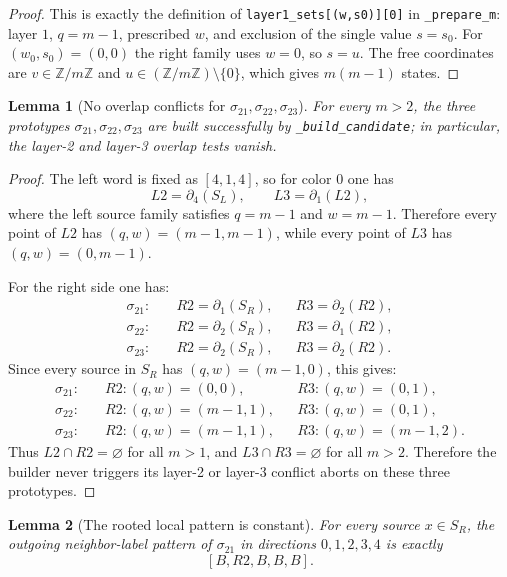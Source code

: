 \documentclass[11pt]{article}
\newtheorem{lemma}{Lemma}
\theoremstyle{remark}
\newcommand{\stepd}[1]{\partial_{#1}}
\begin{document}
\begin{proof}
This is exactly the definition of \texttt{layer1\_sets[(w,s0)][0]} in \texttt{\_prepare\_m}: layer \(1\),
\(q=m-1\), prescribed \(w\), and exclusion of the single value \(s=s_0\).  For \((w_0,s_0)=(0,0)\) the right family
uses \(w=0\), so \(s=u\).  The free coordinates are \(v\in\mathbb Z/m\mathbb Z\) and \(u\in(\mathbb Z/m\mathbb Z)\setminus\{0\}\),
which gives \(m(m-1)\) states.
\end{proof}

\begin{lemma}[No overlap conflicts for \(\sigma_{21},\sigma_{22},\sigma_{23}\)]
For every \(m>2\), the three prototypes \(\sigma_{21},\sigma_{22},\sigma_{23}\) are built successfully by
\texttt{\_build\_candidate}; in particular, the layer-2 and layer-3 overlap tests vanish.
\end{lemma}

\begin{proof}
The left word is fixed as \([4,1,4]\), so for color \(0\) one has
\[
L2=\stepd{4}(S_L),\qquad L3=\stepd{1}(L2),
\]
where the left source family satisfies \(q=m-1\) and \(w=m-1\).  Therefore every point of \(L2\) has
\((q,w)=(m-1,m-1)\), while every point of \(L3\) has \((q,w)=(0,m-1)\).

For the right side one has:
\begin{align*}
\sigma_{21}:&\quad R2=\stepd{1}(S_R), && R3=\stepd{2}(R2),\\
\sigma_{22}:&\quad R2=\stepd{2}(S_R), && R3=\stepd{1}(R2),\\
\sigma_{23}:&\quad R2=\stepd{2}(S_R), && R3=\stepd{2}(R2).
\end{align*}
Since every source in \(S_R\) has \((q,w)=(m-1,0)\), this gives:
\begin{align*}
\sigma_{21}:&\quad R2:(q,w)=(0,0), && R3:(q,w)=(0,1),\\
\sigma_{22}:&\quad R2:(q,w)=(m-1,1), && R3:(q,w)=(0,1),\\
\sigma_{23}:&\quad R2:(q,w)=(m-1,1), && R3:(q,w)=(m-1,2).
\end{align*}
Thus \(L2\cap R2=\varnothing\) for all \(m>1\), and \(L3\cap R3=\varnothing\) for all \(m>2\).
Therefore the builder never triggers its layer-2 or layer-3 conflict aborts on these three prototypes.
\end{proof}

\begin{lemma}[The rooted local pattern is constant]
For every source \(x\in S_R\), the outgoing neighbor-label pattern of \(\sigma_{21}\) in directions
\(0,1,2,3,4\) is exactly
\[
[B,R2,B,B,B].
\]
\end{lemma}
\end{document}

